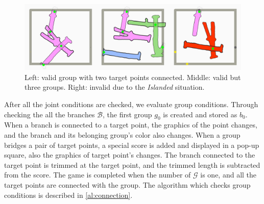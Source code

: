 \begin{figure}[ht]
  \begin{center}
    \includegraphics[width = 0.4\paperwidth]{images/interface/groups.jpg}
    \caption{Left: valid group with two target points connected. Middle: valid but three groups. Right: invalid due to the \textit{Islanded} situation. }
    \label{fig:group}
  \end{center}
\end{figure}


After all the joint conditions are checked, we evaluate group conditions.
Through checking the all the branches $\mathcal{B}$, the first group $g_0$ is created and stored as $b_0$.
When a branch is connected to a target point, the graphics of the point changes, and the branch and its belonging group's color also changes.
When a group bridges a pair of target points, a special score is added and displayed in a pop-up square, also the graphics of target point's changes.
The branch connected to the target point is trimmed at the target point, and the trimmed length is subtracted from the score.
The game is completed when the number of $\mathcal{G}$ is one, and all the target points are connected with the group.
The algorithm which checks group conditions is described in \ref{al:connection}.

